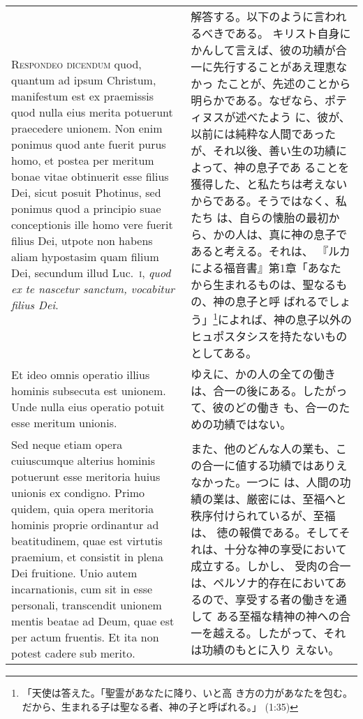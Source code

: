 \documentclass[10pt]{jsarticle} %
\begin{document}
\begin{longtable}{p{21em}p{21em}}
\\



{\scshape Respondeo dicendum} quod, quantum ad ipsum Christum, manifestum est ex
praemissis quod nulla eius merita potuerunt praecedere unionem. Non enim
ponimus quod ante fuerit purus homo, et postea per meritum bonae vitae
obtinuerit esse filius Dei, sicut posuit Photinus, sed ponimus quod a
principio suae conceptionis ille homo vere fuerit filius Dei, utpote non
habens aliam hypostasim quam filium Dei, secundum illud Luc.~{\scshape i}, {\itshape quod ex
te nascetur sanctum, vocabitur filius Dei}. 


&

解答する。以下のように言われるべきである。
キリスト自身にかんして言えば、彼の功績が合一に先行することがあえ理恵なかっ
 たことが、先述のことから明らかである。なぜなら、ポティヌスが述べたよう
 に、彼が、以前には純粋な人間であったが、それ以後、善い生の功績によって、神の息子であ
 ることを獲得した、と私たちは考えないからである。そうではなく、私たち
 は、自らの懐胎の最初から、かの人は、真に神の息子であると考える。それは、
 『ルカによる福音書』第1章「あなたから生まれるものは、聖なるもの、神の息子と呼
 ばれるでしょう」\footnote{「天使は答えた。「聖霊があなたに降り、いと高
 き方の力があなたを包む。だから、生まれる子は聖なる者、神の子と呼ばれる。」
 (1:35) }によれば、神の息子以外のヒュポスタシスを持たないものとしてある。

\\


Et ideo omnis operatio illius
hominis subsecuta est unionem. Unde nulla eius operatio potuit esse
meritum unionis. 

&

 ゆえに、かの人の全ての働きは、合一の後にある。したがって、彼のどの働き
 も、合一のための功績ではない。


\\


Sed neque etiam opera cuiuscumque alterius hominis
potuerunt esse meritoria huius unionis ex condigno.
Primo quidem, quia
opera meritoria hominis proprie ordinantur ad beatitudinem, quae est
virtutis praemium, et consistit in plena Dei fruitione. Unio autem
incarnationis, cum sit in esse personali, transcendit unionem mentis
beatae ad Deum, quae est per actum fruentis. Et ita non potest cadere
sub merito.


&

また、他のどんな人の業も、この合一に値する功績ではありえなかった。一つに
 は、人間の功績の業は、厳密には、至福へと秩序付けられているが、至福は、
 徳の報償である。そしてそれは、十分な神の享受において成立する。しかし、
 受肉の合一は、ペルソナ的存在においてあるので、享受する者の働きを通して
 ある至福な精神の神への合一を越える。したがって、それは功績のもとに入り
 えない。



\end{longtable}
\end{document}
